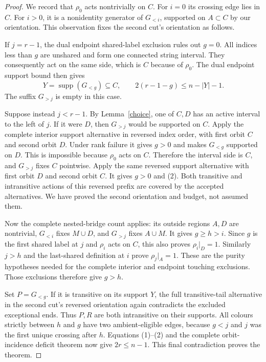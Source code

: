 \documentclass[11pt,a4paper]{article}
\begin{document}
\begin{proof}
We record that $\rho_0$ acts nontrivially on $C$. For $i=0$ its
crossing edge lies in $C$. For $i>0$, it is a nonidentity generator
of $G_{<i}$, supported on $A\subset C$ by our orientation.
This observation fixes the second cut's orientation as follows.

If $j=r-1$, the dual endpoint shared-label exclusion rules out
$g=0$. All indices less than $g$ are unshared and form one connected
string interval. They consequently act on the same side, which is
$C$ because of $\rho_0$. The dual endpoint support bound then gives
\[
 Y=\operatorname{supp}(G_{<g})\subseteq C,\qquad
 2(r-1-g)\leq n-|Y|-1.                                \tag{2}
\]
The suffix $G_{>j}$ is empty in this case.

Suppose instead $j<r-1$. By Lemma~\ref{choice}, one of $C,D$ has
an active interval to the left of $j$. If it were $D$, then
$G_{>j}$ would be supported on $C$. Apply the complete interior
support alternative in reversed index order, with first orbit $C$
and second orbit $D$. Under rank failure it gives $g>0$ and makes
$G_{<g}$ supported on $D$. This is impossible because $\rho_0$
acts on $C$. Therefore the interval side is $C$, and $G_{>j}$ fixes
$C$ pointwise. Apply the same reversed support alternative with
first orbit $D$ and second orbit $C$. It gives $g>0$ and (2).
Both transitive and intransitive actions of this reversed prefix
are covered by the accepted alternatives. We have proved the second
orientation and budget, not assumed them.

Now the complete nested-bridge count applies: its outside regions
$A,D$ are nontrivial, $G_{<i}$ fixes $M\cup D$, and $G_{>j}$ fixes
$A\cup M$. It gives $g\geq h>i$. Since $g$ is the first shared
label at $j$ and $\rho_i$ acts on $C$, this also proves
$\rho_i|_D=1$. Similarly $j>h$ and the last-shared definition at $i$
prove $\rho_j|_A=1$. These are the purity hypotheses needed for the
complete interior and endpoint touching exclusions. Those exclusions
therefore give $g>h$.

Set $P=G_{<g}$. If it is transitive on its support $Y$, the full
transitive-tail alternative in the second cut's reversed orientation
again contradicts the excluded exceptional ends. Thus $P,R$ are
both intransitive on their supports. All colours strictly between
$h$ and $g$ have two ambient-eligible edges, because $g<j$ and $j$
was the first unique crossing after $h$. Equations (1)--(2) and the
complete orbit-incidence deficit theorem now give $2r\leq n-1$.
This final contradiction proves the theorem.
\end{proof}
\end{document}
